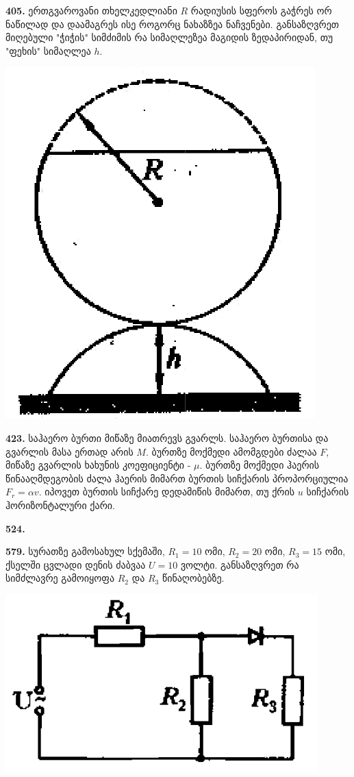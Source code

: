 \documentclass[12pt,a4paper,]{report}
\begin{document}
\textbf{405.} ერთგვაროვანი თხელკედლიანი $R$ რადიუსის სფეროს გაჭრეს ორ ნაწილად და დაამაგრეს ისე როგორც ნახაზზეა ნაჩვენები. განსაზღვრეთ მიღებული "ჭიჭის" სიმძიმის რა სიმაღლეზეა მაგიდის ზედაპირიდან, თუ "ფეხის" სიმაღლეა $h$.
	\begin{center}
		\includegraphics[scale=0.4]{images/405}
	\end{center}

\textbf{423.} საჰაერო ბურთი მიწაზე მიათრევს გვარლს. საჰაერო ბურთისა და გვარლის მასა ერთად არის $M$. ბურთზე მოქმედი ამომგდები ძალაა $F$, მიწაზე გვარლის ხახუნის კოეფიციენტი - $\mu$. ბურთზე მოქმედი ჰაერის წინააღმდეგობის ძალა ჰაერის მიმართ ბურთის სიჩქარის პროპორციულია $F_r=\alpha v$. იპოვეთ ბურთის სიჩქარე დედამიწის მიმართ, თუ ქრის $u$ სიჩქარის ჰორიზონტალური ქარი.

\textbf{524.} 

\textbf{579.} სურათზე გამოსახულ სქემაში, $R_1=10$ ომი, $R_2=20$ ომი, $R_3=15$ ომი, ქსელში ცვლადი დენის ძაბვაა $U=10$ ვოლტი. განსაზღვრეთ რა სიმძლავრე გამოიყოფა $R_2$ და $R_3$ წინაღობებზე. 
		\begin{center}
			\includegraphics[scale=0.5]{images/F579.png}
		\end{center}
	
\end{document}
